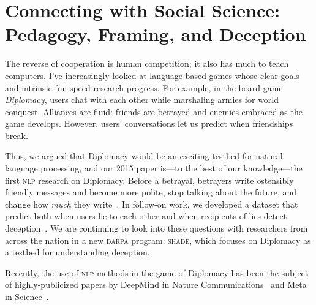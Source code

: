 \documentclass[11pt]{amsart}
\newcommand{\abr}[1]{\textsc{#1}}
\begin{document}
\section{Connecting with Social Science: Pedagogy, Framing, and Deception}

The reverse of cooperation is human competition; it also has much to
teach computers.
%
I've increasingly looked at language-based games whose clear goals and
intrinsic fun speed research progress.
%
For example, in the board game \emph{Diplomacy}, users
chat with each other while marshaling armies for world conquest. Alliances are
fluid: friends are betrayed and enemies embraced as the game develops.
%
However,
users' conversations let us predict when friendships break.

Thus, we argued that Diplomacy would be an exciting testbed for
natural language processing, and our 2015 paper is---to the best of
our knowledge---the first \abr{nlp} research on Diplomacy.
%
Before a betrayal, betrayers write ostensibly friendly messages and become more polite, stop talking about the future, and change how \emph{much} they write~\cite{niculae-15}.
%
In follow-on work, we developed a dataset that predict both when users
lie to each other and when recipients of lies detect
deception~\cite{Peskov-20}.
%
We are continuing to look into these questions with researchers from
across the nation in a new \abr{darpa} program: \abr{shade}, which
focuses on Diplomacy as a testbed for understanding deception.

Recently, the use of \abr{nlp} methods in the game of Diplomacy has
been the subject of highly-publicized papers by DeepMind in Nature
Communications~\cite{kramar-22} and Meta in Science~\cite{bakhtin-22}.

\end{document}
